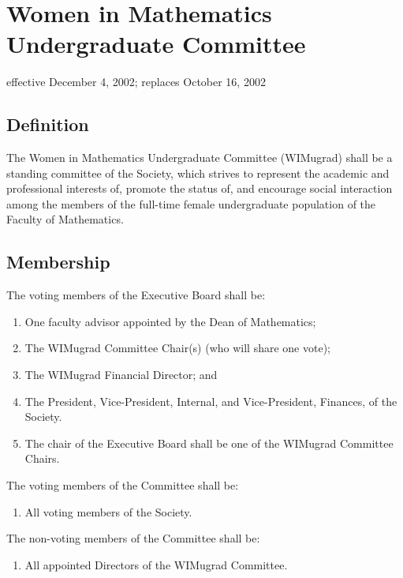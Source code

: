 \section{Women in Mathematics Undergraduate Committee}
effective December 4, 2002; replaces October 16, 2002

\subsection{Definition}
The Women in Mathematics Undergraduate Committee (WIMugrad) shall be a standing committee of the Society, which strives to represent the academic and professional interests of, promote the status of, and encourage social interaction among the members of the full-time female undergraduate population of the Faculty of Mathematics.

\subsection{Membership}
The voting members of the Executive Board shall be:
\begin{enumerate}
\item One faculty advisor appointed by the Dean of Mathematics;
\item The WIMugrad Committee Chair(s) (who will share one vote);
\item The WIMugrad Financial Director; and
\item The President, Vice-President, Internal, and Vice-President, Finances, of the Society.
\item The chair of the Executive Board shall be one of the WIMugrad Committee Chairs.
\end{enumerate}
The voting members of the Committee shall be:
\begin{enumerate}
\item All voting members of the Society.
\end{enumerate}
The non-voting members of the Committee shall be:
\begin{enumerate}
\item All appointed Directors of the WIMugrad Committee.
\end{enumerate}

